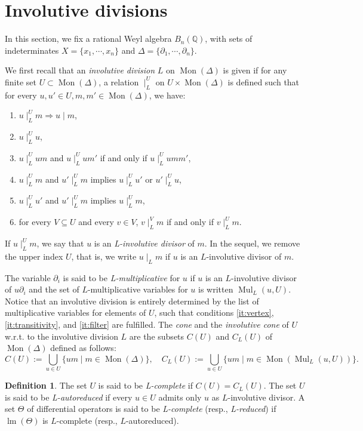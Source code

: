 \documentclass[10pt]{easychair}
\theoremstyle{definition}
\newtheorem{definition}[theorem]{Definition}
\DeclareMathOperator{\lm}{lm}
\newcommand\Q{\mathbb{Q}}
\newcommand\Weyl[1]{B_{#1}(\Q)}
\DeclareMathOperator{\Mon}{Mon}
\DeclareMathOperator{\Mul}{Mul}
\newcommand\divInv[1]{\mid_{#1}}
\begin{document}
\section{Involutive divisions}

In this section, we fix a rational Weyl algebra $\Weyl{n}$, with sets of
indeterminates $X=\{x_1,\cdots,x_n\}$ and
$\Delta=\{\partial_1,\cdots,\partial_n\}$.
\medskip

We first recall that an {\em involutive division} $L$ on $\Mon(\Delta)$
is given if for any finite set $U\subset\Mon(\Delta)$, a relation
$\divInv{L}^U$ on $U\times\Mon(\Delta)$ is defined such that for every
$u,u'\in U,m,m'\in\Mon(\Delta)$, we have:
\begin{enumerate}[label=\alph*)]
\item $u\divInv{L}^Um\Rightarrow u\mid m$,
\item $u\divInv{L}^Uu$,
\item $u\divInv{L}^Uum$ and $u\divInv{L}^Uum'$ if and only if
  $u\divInv{L}^Uumm'$,
\item\label{it:vertex} $u\divInv{L}^Um$ and $u'\divInv{L}^Um$ implies
  $u\divInv{L}^Uu'$ or $u'\divInv{L}^Uu$,
\item\label{it:transitivity} $u\divInv{L}^Uu'$ and $u'\divInv{L}^Um$
  implies $u\divInv{L}^Um$,
\item\label{it:filter} for every $V\subseteq U$ and every $v\in V$,
  $v\divInv{L}^Vm$ if and only if $v\divInv{L}^Um$. 
\end{enumerate}
If $u\divInv{L}^Um$, we  say that $u$ is an {\em L-involutive divisor} of
$m$. In the sequel, we remove the upper index $U$, that is, we write
$u\divInv{L}m$ if $u$ is an $L$-involutive divisor of $m$.
\medskip

The variable $\partial_i$ is said to be {\em L-multiplicative} for $u$ if
$u$ is an $L$-involutive divisor of $u\partial_i$ and the set of
$L$-multiplicative variables for $u$ is written $\Mul_L(u,U)$. Notice
that an involutive division is entirely determined by the list of
multiplicative variables for elements of $U$, such that conditions
\ref{it:vertex}, \ref{it:transitivity}, and \ref{it:filter} are
fulfilled. The {\em cone} and the {\em involutive cone} of $U$ w.r.t. to
the involutive division $L$ are the subsets $C(U)$ and $C_L(U)$ of
$\Mon(\Delta)$ defined as follows:
\[C(U):=\bigcup_{u\in U}\{um\mid m\in\Mon(\Delta)\},\quad
C_L(U):=\bigcup_{u\in U}\{um\mid m\in\Mon(\Mul_L(u,U))\}.\]

\begin{definition}
  The set $U$ is said to be {\em L-complete} if $C(U)=C_L(U)$. The set
  $U$ is said to be {\em L-autoreduced} if every $u\in U$ admits only $u$
  as $L$-involutive divisor. A set $\Theta$ of differential operators is
  said to be {\em L-complete} (resp., {\em L-reduced}) if $\lm(\Theta)$
  is $L$-complete (resp., $L$-autoreduced).
\end{definition}
\end{document}
